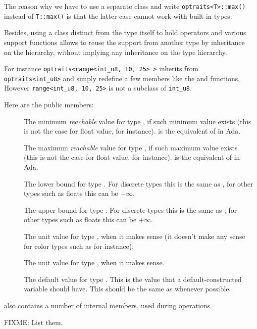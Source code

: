 \begin{OptraitsVersusInnerTypedef}
The reason why we have to use a separate class and write
\lstinline$optraits<T>::max()$ instead of \lstinline$T::max()$ is that
the latter case cannot work with built-in types.

Besides, using a class distinct from the type itself to hold operators
and various support functions allows to reuse the support from another
type by inheritance on the  hierarchy, without implying
any inheritance on the type hierarchy.

For instance \lstinline$optraits<range<int_u8, 10, 25> >$ inherits from
\lstinline$optraits<int_u8>$ and simply redefine a few members like the
 and  functions.  However
\lstinline$range<int_u8, 10, 25>$ is not a subclass of
\lstinline$int_u8$.
\end{OptraitsVersusInnerTypedef}

Here are the public  members:

\begin{description}
\item[]
  The minimum \emph{reachable} value for type , if such minimum value
  exists (this is not the case for float value, for instance).
   is the equivalent of  in Ada.
\item[]
  The maximum \emph{reachable} value for type , if such maximum value
  exists (this is not the case for float value, for instance).
   is the equivalent of  in Ada.
\item[]
  The lower bound for type .  For discrete types this is the
  same as , for other types such as floats this can
  be $-\infty$.
\item[]
  The upper bound for type .  For discrete types this is the
  same as , for other types such as floats this can
  be $+\infty$.
\item[]
  The unit value for type , when it makes sense (it doesn't
  make any sense for color types such as  for instance).
\item[]
  The unit value for type , when it makes sense.
\item[]
  The default value for type .  This is the value that a
  default-constructed  variable should have.  This should
  be the same as  whenever possible.
\end{description}

 also contains a number of internal members, used
during operations.

FIXME: List them.
